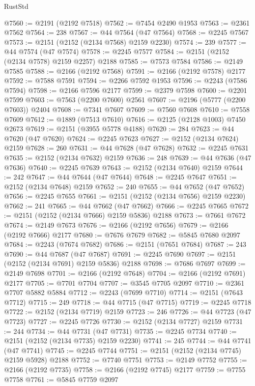 \begin{lexlean}{RustStd}
\begin{coremodule}
@7560 := @2191 (@2192 @7518)
@7562 := @7454 @2490 @1953
@7563 := @2361 @7562
@7564 := 238
@7567 := @44 @7564 (@47 @7564)
@7568 := @2245 @7567
@7573 := @2151 (@2152 (@2134 @7568) @2159 @2230)
@7574 := 239
@7577 := @44 @7574 (@47 @7574)
@7578 := @2245 @7577
@7584 := @2151 (@2152 (@2134 @7578) @2159 @2257) @2188
@7585 := @7573 @7584
@7586 := @2149 @7585
@7588 := @2166 (@2192 @7568)
@7591 := @2166 (@2192 @7578) @2177
@7592 := @7588 @7591
@7594 := @2266 @7592 @1953
@7596 := @2243 (@7586 @7594)
@7598 := @2166 @7596 @2177
@7599 := @2379 @7598
@7600 := @2201 @7599
@7603 := @7563 (@2200 @7600) @2561
@7607 := @2196 (@5777 (@2200 @7603)) @2404
@7608 := @7341 @7607
@7609 := @7560 @7608
@7610 := @7558 @7609
@7612 := @1889 (@7513 @7610)
@7616 := @2125 (@2128 @1003) @7450 @2673
@7619 := @2151 (@3955 @5778 @4188)
@7620 := 284
@7623 := @44 @7620 (@47 @7620)
@7624 := @2245 @7623
@7627 := @2152 (@2134 @7624) @2159
@7628 := 260
@7631 := @44 @7628 (@47 @7628)
@7632 := @2245 @7631
@7635 := @2152 (@2134 @7632) @2159
@7636 := 248
@7639 := @44 @7636 (@47 @7636)
@7640 := @2245 @7639
@7643 := @2152 (@2134 @7640) @2159
@7644 := 242
@7647 := @44 @7644 (@47 @7644)
@7648 := @2245 @7647
@7651 := @2152 (@2134 @7648) @2159
@7652 := 240
@7655 := @44 @7652 (@47 @7652)
@7656 := @2245 @7655
@7661 := @2151 (@2152 (@2134 @7656) @2159 @2230)
@7662 := 241
@7665 := @44 @7662 (@47 @7662)
@7666 := @2245 @7665
@7672 := @2151 (@2152 (@2134 @7666) @2159 @5836) @2188
@7673 := @7661 @7672
@7674 := @2149 @7673
@7676 := @2166 (@2192 @7656)
@7679 := @2166 (@2192 @7666) @2177
@7680 := @7676 @7679
@7682 := @5845 @7680 @2097
@7684 := @2243 (@7674 @7682)
@7686 := @2151 (@7651 @7684)
@7687 := 243
@7690 := @44 @7687 (@47 @7687)
@7691 := @2245 @7690
@7697 := @2151 (@2152 (@2134 @7691) @2159 @5836) @2188
@7698 := @7686 @7697
@7699 := @2149 @7698
@7701 := @2166 (@2192 @7648)
@7704 := @2166 (@2192 @7691) @2177
@7705 := @7701 @7704
@7707 := @3545 @7705 @2097
@7710 := @2361 @7707 @5882 @5884
@7712 := @2243 (@7699 @7710)
@7714 := @2151 (@7643 @7712)
@7715 := 249
@7718 := @44 @7715 (@47 @7715)
@7719 := @2245 @7718
@7722 := @2152 (@2134 @7719) @2159
@7723 := 246
@7726 := @44 @7723 (@47 @7723)
@7727 := @2245 @7726
@7730 := @2152 (@2134 @7727) @2159
@7731 := 244
@7734 := @44 @7731 (@47 @7731)
@7735 := @2245 @7734
@7740 := @2151 (@2152 (@2134 @7735) @2159 @2230)
@7741 := 245
@7744 := @44 @7741 (@47 @7741)
@7745 := @2245 @7744
@7751 := @2151 (@2152 (@2134 @7745) @2159 @5928) @2188
@7752 := @7740 @7751
@7753 := @2149 @7752
@7755 := @2166 (@2192 @7735)
@7758 := @2166 (@2192 @7745) @2177
@7759 := @7755 @7758
@7761 := @5845 @7759 @2097

\end{coremodule}
\end{lexlean}
